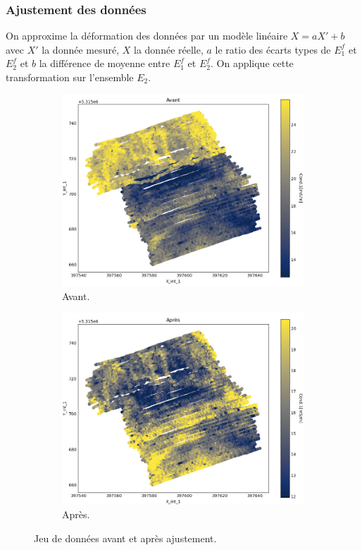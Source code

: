 \documentclass[12pt]{article}
\begin{document}
\newpage
\subsubsection{Ajustement des données}
    
    On approxime la déformation des données par un modèle linéaire $X = aX' + b$ avec $X'$ la donnée mesuré, $X$ la donnée réelle, $a$ le ratio des écarts types de $E_1^f$ et $E_2^f$ et $b$ la différence de moyenne entre $E_1^f$ et $E_2^f$. On applique cette transformation sur l'ensemble $E_2$.

    \begin{figure}[ht!]
        \centering
        \begin{subfigure}[b]{0.475\textwidth}
            \centering
            \includegraphics[width=\textwidth]{Images/Frontiere_ajust1-3_Avant.png}
            \caption[]{Avant.}
        \end{subfigure}
        \hfill
        \begin{subfigure}[b]{0.475\textwidth}  
            \centering 
            \includegraphics[width=\textwidth]{Images/Frontiere_ajust1-3_Apres.png}
            \caption[]{Après.}
        \end{subfigure}
        \caption{\label{2_avant_apres}Jeu de données avant et après ajustement.}
    \end{figure}
\end{document}
